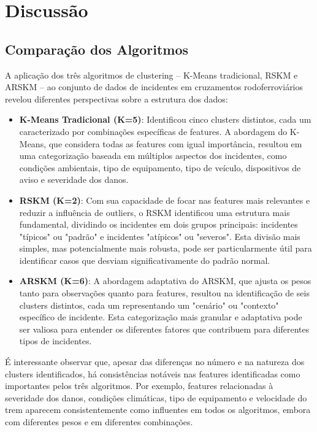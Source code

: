 \documentclass[conference]{IEEEtran}
\begin{document}
\section{Discussão}
\subsection{Comparação dos Algoritmos}
A aplicação dos três algoritmos de clustering – K-Means tradicional, RSKM e ARSKM – ao conjunto de dados de incidentes em cruzamentos rodoferroviários revelou diferentes perspectivas sobre a estrutura dos dados:

\begin{itemize}
    \item \textbf{K-Means Tradicional (K=5)}: Identificou cinco clusters distintos, cada um caracterizado por combinações específicas de features. A abordagem do K-Means, que considera todas as features com igual importância, resultou em uma categorização baseada em múltiplos aspectos dos incidentes, como condições ambientais, tipo de equipamento, tipo de veículo, dispositivos de aviso e severidade dos danos.
    
    \item \textbf{RSKM (K=2)}: Com sua capacidade de focar nas features mais relevantes e reduzir a influência de outliers, o RSKM identificou uma estrutura mais fundamental, dividindo os incidentes em dois grupos principais: incidentes "típicos" ou "padrão" e incidentes "atípicos" ou "severos". Esta divisão mais simples, mas potencialmente mais robusta, pode ser particularmente útil para identificar casos que desviam significativamente do padrão normal.
    
    \item \textbf{ARSKM (K=6)}: A abordagem adaptativa do ARSKM, que ajusta os pesos tanto para observações quanto para features, resultou na identificação de seis clusters distintos, cada um representando um "cenário" ou "contexto" específico de incidente. Esta categorização mais granular e adaptativa pode ser valiosa para entender os diferentes fatores que contribuem para diferentes tipos de incidentes.
\end{itemize}

É interessante observar que, apesar das diferenças no número e na natureza dos clusters identificados, há consistências notáveis nas features identificadas como importantes pelos três algoritmos. Por exemplo, features relacionadas à severidade dos danos, condições climáticas, tipo de equipamento e velocidade do trem aparecem consistentemente como influentes em todos os algoritmos, embora com diferentes pesos e em diferentes combinações.
\end{document}
